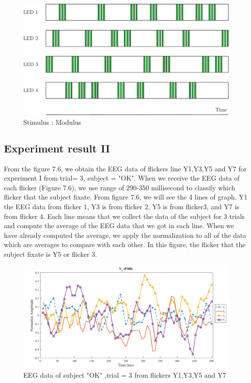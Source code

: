 \begin{figure}[ht]
	\centering
	\includegraphics[scale = 0.65]{chapter7/mod_uni.pdf}
	\caption{Stimulus : Modulus}
\end{figure}

\newpage
\subsection{Experiment result II}

\hspace{1.5cm} From the figure 7.6, we obtain the EEG data of flickers line Y1,Y3,Y5 and Y7 for experiment I from trial= 3, subject = "OK". When we receive the EEG data of each flicker (Figure 7.6), we use range of 290-350 millisecond to classify which flicker that the subject fixate. From figure 7.6, we will see the 4 lines of graph. Y1 the EEG data from flicker 1, Y3 is from flicker 2, Y5 is from flicker3, and Y7 is from flicker 4. Each line means that we collect the data of the subject for 3 trials and compute the average of the EEG data that we got in each line. When we have already computed the average, we apply the normalization to all of the data which are averages to compare with each other. In this figure, the flicker that the subject fixate is Y5 or flicker 3.

\begin{figure}[ht]
	\centering
	\includegraphics[width=\textwidth]{chapter7/erp_result.pdf}
	\caption{EEG data of subject "OK" ,trial = 3 from flickers Y1,Y3,Y5 and Y7}
\end{figure}

